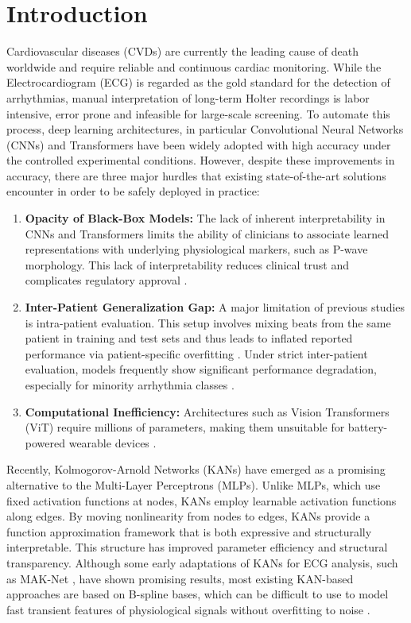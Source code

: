 \documentclass[pdflatex,sn-mathphys-num]{sn-jnl}
\theoremstyle{thmstyleone}
\theoremstyle{thmstyletwo}
\theoremstyle{thmstylethree}
\begin{document}
\section{Introduction}

Cardiovascular diseases (CVDs) are currently the leading cause of death worldwide and require reliable and continuous cardiac monitoring. While the Electrocardiogram (ECG) is regarded as the gold standard for the detection of arrhythmias, manual interpretation of long-term Holter recordings is labor intensive, error prone and infeasible for large-scale screening. To automate this process, deep learning architectures, in particular Convolutional Neural Networks (CNNs) \cite{takalo-mattila_inter-patient_2018, guo_inter-patient_2019} and Transformers \cite{akan_ecgformer_2024} have been widely adopted with high accuracy under the controlled experimental conditions. However, despite these improvements in accuracy, there are three major hurdles that existing state-of-the-art solutions encounter in order to be safely deployed in practice:

\begin{enumerate}
    \item \textbf{Opacity of Black-Box Models:} The lack of inherent interpretability in CNNs and Transformers limits the ability of clinicians to associate learned representations with underlying physiological markers, such as P-wave morphology. This lack of interpretability reduces clinical trust and complicates regulatory approval \cite{taleban_explainable_2026}.
    \item \textbf{Inter-Patient Generalization Gap:} A major limitation of previous studies is intra-patient evaluation. This setup involves mixing beats from the same patient in training and test sets and thus leads to inflated reported performance via patient-specific overfitting \cite{bahrami_investigation_2025}. Under strict inter-patient evaluation, models frequently show significant performance degradation, especially for minority arrhythmia classes \cite{xiao_deep_2023, silva_systematic_2025}.
    \item \textbf{Computational Inefficiency:} Architectures such as Vision Transformers (ViT) require millions of parameters, making them unsuitable for battery-powered wearable devices \cite{elsheikhy_lightweight_2025}.
\end{enumerate}

Recently, Kolmogorov-Arnold Networks (KANs) \cite{liu_kan_2024} have emerged as a promising alternative to the Multi-Layer Perceptrons (MLPs). Unlike MLPs, which use fixed activation functions at nodes, KANs employ learnable activation functions along edges. By moving nonlinearity from nodes to edges, KANs provide a function approximation framework that is both expressive and structurally interpretable. This structure has improved parameter efficiency and structural transparency. Although some early adaptations of KANs for ECG analysis, such as MAK-Net \cite{zhao_mak-net_2025}, have shown promising results, most existing KAN-based approaches are based on B-spline bases, which can be difficult to use to model fast transient features of physiological signals without overfitting to noise \cite{bozorgasl_liu_2024}.
\end{document}
